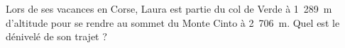 
Lors de ses vacances en Corse, Laura est partie du col de Verde à 1~289~m d'altitude pour se rendre au sommet du Monte Cinto à 2~706~m. Quel est le dénivelé de son trajet ?